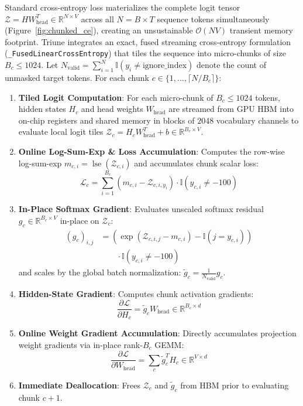 \documentclass[10pt,twocolumn,letterpaper]{article}
\begin{document}
Standard cross-entropy loss materializes the complete logit tensor $\mathcal{Z} = H W_{\text{head}}^T \in \mathbb{R}^{N \times V}$ across all $N = B \times T$ sequence tokens simultaneously (Figure~\ref{fig:chunked_ce}), creating an unsustainable $\mathcal{O}(NV)$ transient memory footprint.
Triune integrates an exact, fused streaming cross-entropy formulation (\texttt{\_FusedLinearCrossEntropy}) that tiles the sequence into micro-chunks of size $B_c \le 1024$.
Let $N_{\text{valid}} = \sum_{i=1}^N \mathbb{I}(y_i \neq \text{ignore\_index})$ denote the count of unmasked target tokens. For each chunk $c \in \{1, \dots, \lceil N / B_c \rceil\}$:
\begin{enumerate}
    \item \textbf{Tiled Logit Computation}: For each micro-chunk of $B_c \le 1024$ tokens, hidden states $H_c$ and head weights $W_{\text{head}}$ are streamed from GPU HBM into on-chip registers and shared memory in blocks of $2048$ vocabulary channels to evaluate local logit tiles $\mathcal{Z}_c = H_c W_{\text{head}}^T + b \in \mathbb{R}^{B_c \times V}$.
    \item \textbf{Online Log-Sum-Exp \& Loss Accumulation}: Computes the row-wise log-sum-exp $m_{c, i} = \operatorname{lse}(\mathcal{Z}_{c, i})$ and accumulates chunk scalar loss:
    \begin{equation}
        \mathcal{L}_c = \sum_{i=1}^{B_c} (m_{c, i} - \mathcal{Z}_{c, i, y_i}) \cdot \mathbb{I}(y_{c, i} \neq -100)
    \end{equation}
    \item \textbf{In-Place Softmax Gradient}: Evaluates unscaled softmax residual $g_c \in \mathbb{R}^{B_c \times V}$ in-place on $\mathcal{Z}_c$:
    \begin{equation}
    \begin{aligned}
        (g_c)_{i, j} &= \left( \exp(\mathcal{Z}_{c, i, j} - m_{c, i}) - \mathbb{I}(j = y_{c, i}) \right) \\
        &\qquad \cdot \mathbb{I}(y_{c, i} \neq -100)
    \end{aligned}
    \end{equation}
    and scales by the global batch normalization: $\tilde{g}_c = \frac{1}{N_{\text{valid}}} g_c$.
    \item \textbf{Hidden-State Gradient}: Computes chunk activation gradients:
    \begin{equation}
        \frac{\partial \mathcal{L}}{\partial H_c} = \tilde{g}_c W_{\text{head}} \in \mathbb{R}^{B_c \times d}
    \end{equation}
    \item \textbf{Online Weight Gradient Accumulation}: Directly accumulates projection weight gradients via in-place rank-$B_c$ GEMM:
    \begin{equation}
        \frac{\partial \mathcal{L}}{\partial W_{\text{head}}} = \sum_{c} \tilde{g}_c^T H_c \in \mathbb{R}^{V \times d}
    \end{equation}
    \item \textbf{Immediate Deallocation}: Frees $\mathcal{Z}_c$ and $\tilde{g}_c$ from HBM prior to evaluating chunk $c+1$.
\end{enumerate}
\end{document}
